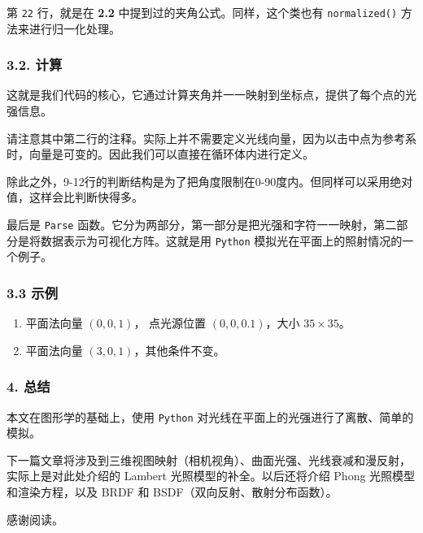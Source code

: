 \documentclass[
]{article}
\begin{document}
第 \texttt{22} 行，就是在 \textbf{2.2}
中提到过的夹角公式。同样，这个类也有 \texttt{normalized()}
方法来进行归一化处理。

\hypertarget{32-ux8ba1ux7b97}{%
\subsubsection{3.2. 计算}\label{32-ux8ba1ux7b97}}

  

这就是我们代码的核心，它通过计算夹角并一一映射到坐标点，提供了每个点的光强信息。

请注意其中第二行的注释。实际上并不需要定义光线向量，因为以击中点为参考系时，向量是可变的。因此我们可以直接在循环体内进行定义。

除此之外，9-12行的判断结构是为了把角度限制在0-90度内。但同样可以采用绝对值，这样会比判断快得多。

  

最后是 \texttt{Parse}
函数。它分为两部分，第一部分是把光强和字符一一映射，第二部分是将数据表示为可视化方阵。这就是用
\texttt{Python} 模拟光在平面上的照射情况的一个例子。

\hypertarget{33-ux793aux4f8b}{%
\subsubsection{3.3 示例}\label{33-ux793aux4f8b}}

\begin{enumerate}
\def\labelenumi{\arabic{enumi}.}
\item
  平面法向量 \((0, 0, 1)\)， 点光源位置 \((0,0,0.1)\)，大小
  \(35\times35\)。

    
\item
  平面法向量 \((3, 0, 1)\)，其他条件不变。

    
\end{enumerate}

\hypertarget{4-ux603bux7ed3}{%
\subsubsection{4. 总结}\label{4-ux603bux7ed3}}

本文在图形学的基础上，使用 \texttt{Python}
对光线在平面上的光强进行了离散、简单的模拟。

下一篇文章将涉及到三维视图映射（相机视角）、曲面光强、光线衰减和漫反射，实际上是对此处介绍的
Lambert 光照模型的补全。以后还将介绍 Phong 光照模型和渲染方程，以及 BRDF
和 BSDF（双向反射、散射分布函数）。

感谢阅读。
\end{document}
